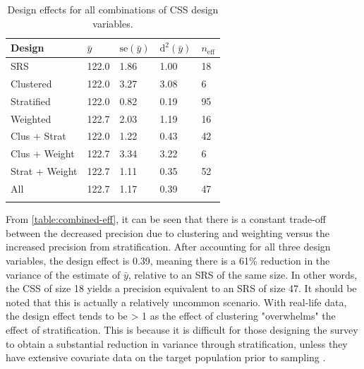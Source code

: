 \begin{longtable}{P{30mm}P{22.5mm}P{22.5mm}P{22.5mm}P{22.5mm}}
\toprule
Design 	 			& $\bar{y}$ 				& $\text{se}(\bar{y})$			& $\text{d}^{2}(\bar{y})$		& $n_{\text{eff}}$			\\ \bottomrule
SRS          				& 122.0                        		& 1.86					& 1.00      					& 18		         			\\ \hline
Clustered           			& 122.0                        		& 3.27					& 3.08               				& 6						\\ \hline
Stratified          			& 122.0                         		& 0.82					& 0.19               				& 95						\\ \hline
Weighted           			& 122.7	                        		& 2.03					& 1.19               				& 16						\\ \hline
Clus + Strat           		& 122.0                     			& 1.22					& 0.43               				& 42						\\ \hline
Clus + Weight           		& 122.7	                       		& 3.34					& 3.22               				& 6						\\ \hline
Strat + Weight           		& 122.7	                         		& 1.11					& 0.35               				& 52						\\ \hline
All           				& 122.7	                       		& 1.17					& 0.39               				& 47						\\ \bottomrule
\caption{Design effects for all combinations of CSS design variables.}
\label{table:combined-eff}
\end{longtable}

From \autoref{table:combined-eff}, it can be seen that there is a constant trade-off between the decreased precision due to clustering and weighting versus the increased precision from stratification. After accounting for all three design variables, the design effect is 0.39, meaning there is a 61\% reduction in the variance of the estimate of  $\bar{y}$, relative to an SRS of the same size. In other words, the CSS of size 18 yields a precision equivalent to an SRS of size 47. It should be noted that this is actually a relatively uncommon scenario. With real-life data, the design effect tends to be > 1 as the effect of clustering "overwhelms" the effect of stratification. This is because it is difficult for those designing the survey to obtain a substantial reduction in variance through stratification, unless they have extensive covariate data on the target population prior to sampling \citep{heeringa2017}.

